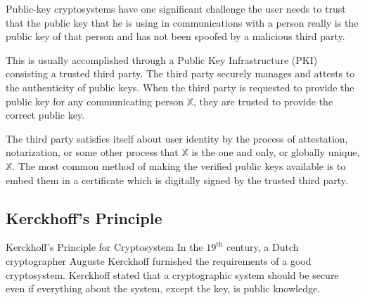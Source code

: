 \documentclass[british]{report}
\begin{document}
Public-key cryptosystems have one significant challenge \textminus{}
the user needs to trust that the public key that he is using in communications
with a person really is the public key of that person and has not
been spoofed by a malicious third party.

This is usually accomplished through a Public Key Infrastructure (PKI)
consisting a trusted third party. The third party securely manages
and attests to the authenticity of public keys. When the third party
is requested to provide the public key for any communicating person
$\mathbb{X}$, they are trusted to provide the correct public key.

The third party satisfies itself about user identity by the process
of attestation, notarization, or some other process \textminus{} that
$\mathbb{X}$ is the one and only, or globally unique, $\mathbb{X}$.
The most common method of making the verified public keys available
is to embed them in a certificate which is digitally signed by the
trusted third party.

\subsection{Kerckhoff\textquoteright s Principle}

Kerckhoff's Principle for Cryptosystem In the $19^{\text{th}}$ century,
a Dutch cryptographer Auguste Kerckhoff furnished the requirements
of a good cryptosystem. Kerckhoff stated that a cryptographic system
should be secure even if everything about the system, except the key,
is public knowledge.
\end{document}
